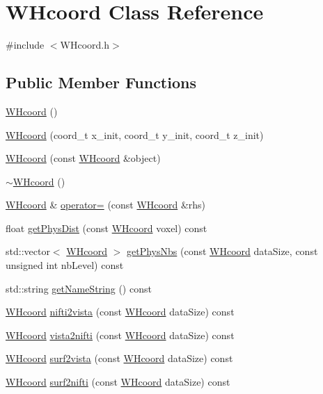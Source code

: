 \hypertarget{classWHcoord}{\section{\-W\-Hcoord \-Class \-Reference}
\label{classWHcoord}
}


{\ttfamily \#include $<$\-W\-Hcoord.\-h$>$}

\subsection*{\-Public \-Member \-Functions}
\begin{DoxyCompactItemize}
\item 
\hyperlink{classWHcoord_aa5c17342dbe719cc415edf51ffb4350f}{\-W\-Hcoord} ()
\item 
\hyperlink{classWHcoord_a987b8d4aaa2e0081f04033b2be8e8b78}{\-W\-Hcoord} (coord\-\_\-t x\-\_\-init, coord\-\_\-t y\-\_\-init, coord\-\_\-t z\-\_\-init)
\item 
\hyperlink{classWHcoord_a932e18e68cf024052b2b8e37acff536f}{\-W\-Hcoord} (const \hyperlink{classWHcoord}{\-W\-Hcoord} \&object)
\item 
\hyperlink{classWHcoord_a4bbb4d5308187ba0892a933120bf4c63}{$\sim$\-W\-Hcoord} ()
\item 
\hyperlink{classWHcoord}{\-W\-Hcoord} \& \hyperlink{classWHcoord_ac695022ff163e6f4099d1c88e86659fb}{operator=} (const \hyperlink{classWHcoord}{\-W\-Hcoord} \&rhs)
\item 
float \hyperlink{classWHcoord_a9e397e93eaf1dc9dc289d707e1167897}{get\-Phys\-Dist} (const \hyperlink{classWHcoord}{\-W\-Hcoord} voxel) const 
\item 
std\-::vector$<$ \hyperlink{classWHcoord}{\-W\-Hcoord} $>$ \hyperlink{classWHcoord_a214eb2a2c641e1cad3cb4dd7341957a8}{get\-Phys\-Nbs} (const \hyperlink{classWHcoord}{\-W\-Hcoord} data\-Size, const unsigned int nb\-Level) const 
\item 
std\-::string \hyperlink{classWHcoord_ac3586e38d47b1b9b08e1f1618ed0a038}{get\-Name\-String} () const 
\item 
\hyperlink{classWHcoord}{\-W\-Hcoord} \hyperlink{classWHcoord_abd162d2be43273f5aead32723fe39fdd}{nifti2vista} (const \hyperlink{classWHcoord}{\-W\-Hcoord} data\-Size) const 
\item 
\hyperlink{classWHcoord}{\-W\-Hcoord} \hyperlink{classWHcoord_ae189a048a5aa0b1375833f542ffebc24}{vista2nifti} (const \hyperlink{classWHcoord}{\-W\-Hcoord} data\-Size) const 
\item 
\hyperlink{classWHcoord}{\-W\-Hcoord} \hyperlink{classWHcoord_a8d15380fff405a08ef4f7b0b02b290e7}{surf2vista} (const \hyperlink{classWHcoord}{\-W\-Hcoord} data\-Size) const 
\item 
\hyperlink{classWHcoord}{\-W\-Hcoord} \hyperlink{classWHcoord_a1aa2b290b01b2effefc07ba791395510}{surf2nifti} (const \hyperlink{classWHcoord}{\-W\-Hcoord} data\-Size) const 
\end{DoxyCompactItemize}

